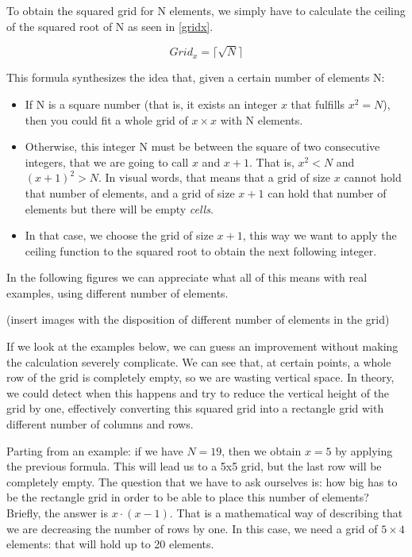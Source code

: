 To obtain the squared grid for N elements, we simply have to calculate the ceiling of the squared root of N as seen in \eqref{gridx}.

\begin{equation}
  Grid_{x} = \lceil\sqrt{N}\rceil \label{gridx}
\end{equation}

This formula synthesizes the idea that, given a certain number of elements N:

\begin{itemize}
  \item If N is a square number (that is, it exists an integer $x$ that
  fulfills $x^2 = N$), then you could fit a whole grid of $x\times{}x$ with
  N elements.
  \item Otherwise, this integer N must be between the square of two
  consecutive integers, that we are going to call $x$ and $x+1$. That is,
  $x^2 < N$ and $(x+1)^2 > N$. In visual words, that means that a grid of
  size $x$ cannot hold that number of elements, and a grid of size $x+1$ can
  hold that number of elements but there will be empty \emph{cells}.
  \item In that case, we choose the grid of size $x+1$, this way we want to
  apply the ceiling function to the squared root to obtain the next following
  integer.
\end{itemize}

In the following figures we can appreciate what all of this means with real examples, using different number of elements.

(insert images with the disposition of different number of elements in the
grid)

If we look at the examples below, we can guess an improvement without making
the calculation severely complicate. We can see that, at certain points, a
whole row of the grid is completely empty, so we are wasting vertical space.
In theory, we could detect when this happens and try to reduce the vertical
height of the grid by one, effectively converting this squared grid into a
rectangle grid with different number of columns and rows.

Parting from an example: if we have $N = 19$, then we obtain $x = 5$ by
applying the previous formula. This will lead us to a 5x5 grid, but the last
row will be completely empty. The question that we have to ask ourselves is:
how big has to be the rectangle grid in order to be able to place this number
of elements? Briefly, the answer is $x \cdot (x - 1)$. That is a mathematical
way of describing that we are decreasing the number of rows by one. In this
case, we need a grid of $5 \times 4$ elements: that will hold up to 20
elements.

